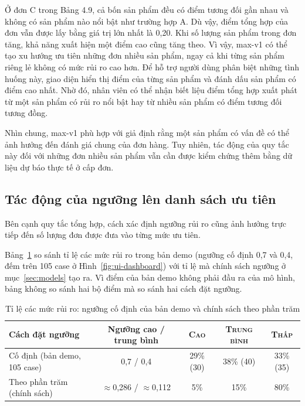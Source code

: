 \documentclass[12pt,a4paper]{report}
\begin{document}
Ở đơn C trong Bảng 4.9, cả bốn sản phẩm đều có điểm tương đối gần nhau và không có sản phẩm nào nổi bật như trường hợp A. Dù vậy, điểm tổng hợp của đơn vẫn được lấy bằng giá trị lớn nhất là 0,20. Khi số lượng sản phẩm trong đơn tăng, khả năng xuất hiện một điểm cao cũng tăng theo. Vì vậy, max-v1 có thể tạo xu hướng ưu tiên những đơn nhiều sản phẩm, ngay cả khi từng sản phẩm riêng lẻ không có mức rủi ro cao hơn. Để hỗ trợ người dùng phân biệt những tình huống này, giao diện hiển thị điểm của từng sản phẩm và đánh dấu sản phẩm có điểm cao nhất. Nhờ đó, nhân viên có thể nhận biết liệu điểm tổng hợp xuất phát từ một sản phẩm có rủi ro nổi bật hay từ nhiều sản phẩm có điểm tương đối tương đồng.

Nhìn chung, max-v1 phù hợp với giả định rằng một sản phẩm có vấn đề có thể ảnh hưởng đến đánh giá chung của đơn hàng. Tuy nhiên, tác động của quy tắc này đối với những đơn nhiều sản phẩm vẫn cần được kiểm chứng thêm bằng dữ liệu dự báo thực tế ở cấp đơn.

\FloatBarrier
\subsection{Tác động của ngưỡng lên danh sách ưu tiên}\label{sec:demo-threshold}

Bên cạnh quy tắc tổng hợp, cách xác định ngưỡng rủi ro cũng ảnh hưởng trực tiếp đến số lượng đơn được đưa vào từng mức ưu tiên.

Bảng~\ref{tab:demo-threshold} so sánh tỉ lệ các mức rủi ro trong bản demo (ngưỡng cố định 0,7 và 0,4, đếm trên 105 case ở Hình~\ref{fig:ui-dashboard}) với tỉ lệ mà chính sách ngưỡng ở mục~\ref{sec:models} tạo ra. Vì điểm của bản demo không phải đầu ra của mô hình, bảng không so sánh hai bộ điểm mà so sánh hai cách đặt ngưỡng.

\begin{table}[htbp]\centering\small
\caption{Tỉ lệ các mức rủi ro: ngưỡng cố định của bản demo và chính sách theo phần trăm}\label{tab:demo-threshold}
\begin{tabular}{lcccc}
\toprule
Cách đặt ngưỡng & Ngưỡng cao / trung bình & \textsc{Cao} & \textsc{Trung bình} & \textsc{Thấp} \\
\midrule
Cố định (bản demo, 105 case)        & 0,7 / 0,4         & 29\% (30) & 38\% (40) & 33\% (35) \\
Theo phần trăm (chính sách)         & $\approx$0,286 / $\approx$0,112 & 5\%  & 15\% & 80\% \\
\bottomrule
\end{tabular}
\end{table}
\end{document}
